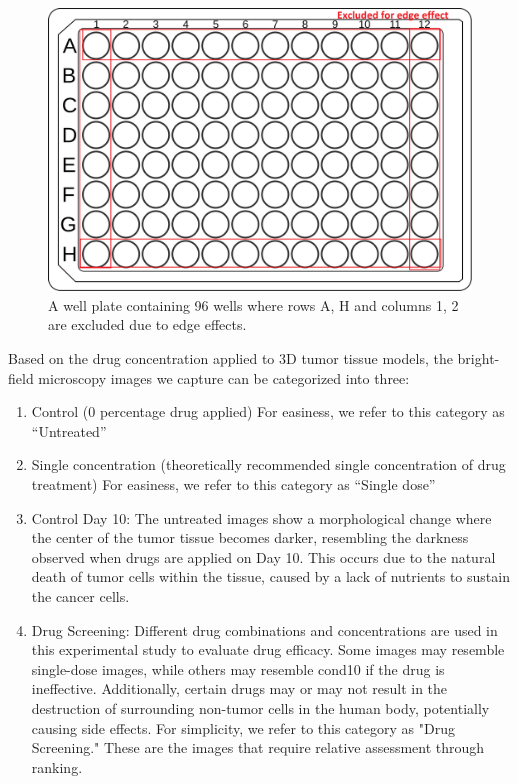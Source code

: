 \begin{figure}[H]
  \centering
  \includegraphics[width=0.9\linewidth]{figures/WellPlate.png} %
  \caption{A well plate containing 96 wells where rows A, H and columns 1, 2 are excluded due to edge effects.}
  \label{fig:Wellplate}
\end{figure}

Based on the drug concentration applied to 3D tumor tissue models, the bright-field microscopy images we capture can be categorized into three:

\begin{enumerate}
  \item Control (0 percentage drug applied) For easiness, we refer to this category as ``Untreated''
    
  \item Single concentration (theoretically recommended single concentration of drug treatment) For easiness, we refer to this category as ``Single dose''
        


  \item Control Day 10: The untreated images show a morphological change where the center of the tumor tissue becomes darker, resembling the darkness
   observed when drugs are applied on Day 10. This occurs due to the natural death of tumor cells within the tissue, caused by a lack of nutrients to 
   sustain the cancer cells.
   \item Drug Screening: Different drug combinations and concentrations are used in this experimental study to evaluate drug efficacy. Some images may 
   resemble single-dose images, while others may resemble cond10 if the drug is ineffective. Additionally, certain drugs may or may not result 
   in the destruction of surrounding non-tumor cells in the human body, potentially causing side effects. For simplicity, we refer to this category as 
   "Drug Screening." These are the images that require relative assessment through ranking.
        
\end{enumerate}


